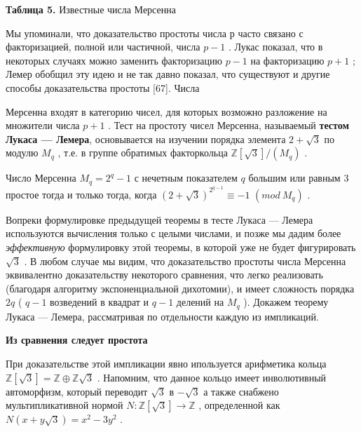 \begin{center}
{\bf Таблица 5.} Известные числа Мерсенна 
\end{center}

Мы упоминали, что доказательство простоты числа $р$ часто  
связано с факторизацией, полной или частичной, числа $p-1$
. Лукас  
показал, что в некоторых случаях можно заменить факторизацию $p-1$
 на 
факторизацию $p+1$
; Лемер обобщил эту идею и не так давно показал, 
что существуют и другие способы доказательства простоты [67]. Числа

\newpage

Мерсенна входят в категорию чисел, для которых возможно  
разложение на множители числа $p+1$
. 
Тест на простоту чисел Мерсенна, называемый {\bf тестом Лукаса — 
Лемера}, основывается на изучении порядка элемента $2+\sqrt 3$
 по модулю 
$M_q$
, т.е. в группе обратимых факторкольца $\mathbb{Z}[\sqrt 3]/(M_q)$
. 

\begin{thm}

Число Мерсенна $M_q = 2^q -1$
 с нечетным показателем $q$
 большим 
или равным 3
 простое тогда и только тогда, когда $(2+\sqrt 3)^{2^{q-1}}\equiv -1$ $(mod \ M_q)$
 . 
\end{thm}

Вопреки формулировке предыдущей теоремы в тесте Лукаса —  
Лемера используются вычисления только с целыми числами, и позже мы 
дадим более {\sl эффективную} формулировку этой теоремы, в которой уже 
не будет фигурировать $\sqrt 3$
. В любом случае мы видим, что  
доказательство простоты числа Мерсенна эквивалентно доказательству  
некоторого сравнения, что легко реализовать (благодаря алгоритму  
экспоненциальной дихотомии), и имеет сложность порядка $2q$
 ( $q-1$ возведений 
в квадрат и $q-1$
 делений на $M_q$
 ). Докажем теорему Лукаса — Лемера, 
рассматривая по отдельности каждую из импликаций. 

{\bf Из сравнения следует простота} 

При доказательстве этой импликации явно ипользуется арифметика 
кольца $\mathbb{Z}[\sqrt 3] = \mathbb{Z}\oplus\mathbb{Z}\sqrt 3$
. Напомним, что данное кольцо имеет инволютивный автоморфизм, который переводит $\sqrt 3$ в $-\sqrt 3$
 а также  
снабжено мультипликативной нормой $N : \mathbb{Z}[\sqrt 3]\rightarrow\mathbb{Z}$
, определенной как $N(x+y\sqrt 3)=x^2 - 3y^2$
. 

